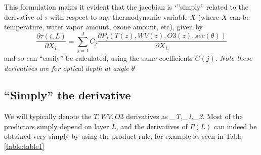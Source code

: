 \documentclass[11pt]{article}
\begin{document}
This formulation makes it evident that the jacobian is `''simply''
related to the derivative of $\tau$ with respect to any thermodynamic
variable $X$ (where $X$ can be temperature, water vapor amount, ozone
amount, etc), given by
\begin{equation}
\frac{\partial \tau(i,L)}{\partial X_L} = \sum_{j=1}^J C_{j} \frac{\partial P_{j}(T(z),WV(z),O3(z),sec(\theta))}{\partial X_L}
\label{eqn:deriv}
\end{equation}
and so can ``easily'' be calculated, using the same coefficients
$C(j)$. \textit{Note these derivatives are for optical depth at angle
  $\theta$ }

\subsection{``Simply'' the derivative}

We will typically denote the $T,WV,O3$ derivatives as
\textit{\_T,\_1,\_3}.  Most of the predictors simply depend on layer
$L$, and the derivatives of $P(L)$ can indeed be obtained very simply by using
the product rule, for example as seen in Table \ref{table:table1}
\end{document}
